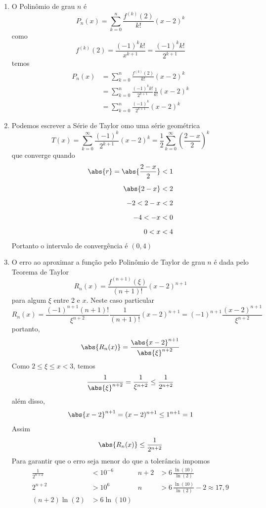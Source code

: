 \documentclass[a4paper,12pt,fleqn]{article}
\begin{document}
\begin{answer}
\begin{enumerate}[label=\alph*)]
  \item O Polinômio de grau $n$ é
  \[
    P_n(x) = \sum_{k=0}^n \frac{f^{(k)}(2)}{k!}\left(x-2\right)^k
  \]
  como
  \[
    f^{(k)}(2)
    = \frac{(-1)^kk!}{x^{k+1}}
    = \frac{(-1)^kk!}{2^{k+1}}
  \]
  temos
  \begin{align*}
    P_n(x)
    & = \sum_{k=0}^n \frac{f^{(k)}(2)}{k!}\left(x-2\right)^k \\[2mm]
    & = \sum_{k=0}^n \frac{(-1)^kk!}{2^{k+1}}\frac{1}{k!}\left(x-2\right)^k \\[2mm]
    & = \sum_{k=0}^n \frac{(-1)^k}{2^{k+1}}\left(x-2\right)^k
  \end{align*}

  \item Podemos escrever a Série de Taylor omo uma série geométrica
  \[
    T(x)
    = \sum_{k=0}^\infty \frac{(-1)^k}{2^{k+1}}\left(x-2\right)^k
    = \frac{1}{2}\sum_{k=0}^\infty \left(\frac{2-x}{2}\right)^k
  \]
  que converge quando
  \begin{align*}
    \abs{r} = \abs{\frac{2-x}{2}} & < 1 \\[2mm]
    \abs{2-x}                     & < 2 \\[2mm]
    -2 < 2-x                      & < 2 \\[2mm]
    -4 < -x                       & < 0 \\[2mm]
    0  < x                        & < 4
  \end{align*}
  Portanto o intervalo de convergência é \((0, 4)\)

  \item O erro ao aproximar a função pelo Polinômio de Taylor de grau $n$
  é dada pelo Teorema de Taylor
  \[
    R_n(x)
    = \frac{f^{(n+1)}(\xi)}{(n+1)!}(x-2)^{n+1}
  \]
  para algum $\xi$ entre 2 e $x$. Neste caso particular
  \[
    R_n(x)
    = \frac{(-1)^{n+1}(n+1)!}{\xi^{n+2}}\frac{1}{(n+1)!}(x-2)^{n+1}
    = (-1)^{n+1}\frac{(x-2)^{n+1}}{\xi^{n+2}}
  \]
  portanto,
  \[
    \abs{R_n(x)}
    = \frac{\abs{x-2}^{n+1}}{\abs{\xi}^{n+2}}
  \]
  Como $2 \leq \xi \leq x < 3$, temos
  \[
    \frac{1}{\abs{\xi}^{n+2}}
    = \frac{1}{\xi^{n+2}}
    \leq \frac{1}{2^{n+2}}
  \]
  além disso,
  \[
    \abs{x-2}^{n+1}
    = (x-2)^{n+1}
    \leq 1^{n+1} = 1
  \]
  Assim
  \[
    \abs{R_n(x)}
    \leq \frac{1}{2^{n+2}}
  \]
  Para garantir que o erro seja menor do que a tolerância impomos
  \begin{align*}
    \frac{1}{2^{n+2}} & < 10^{-6}   & n + 2 & > 6\,\frac{\ln(10)}{\ln(2)}                  \\
    2^{n+2}           & > 10^6      & n     & > 6\,\frac{\ln(10)}{\ln(2)} - 2 \approx 17,9 \\
    (n+2)\ln(2)       & > 6\ln(10)
  \end{align*}

\end{enumerate}
\end{answer}

\end{document}
